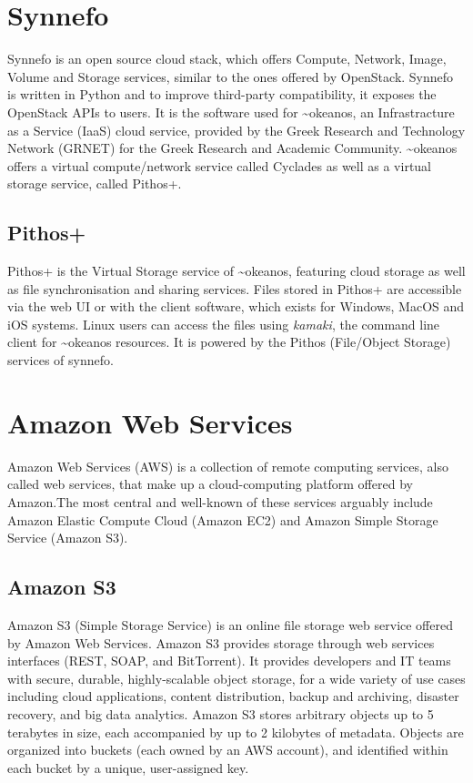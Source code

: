 \section{Synnefo}
  Synnefo\cite{synnefo} is an open source cloud stack, which offers Compute, Network, Image, Volume and Storage services, similar to the ones offered by OpenStack. Synnefo is written in Python and to improve third-party compatibility, it exposes the OpenStack APIs to users\cite{synnefo-api}. It is the software used for \textasciitilde okeanos\cite{okeanos}, an Infrastracture as a Service (IaaS) cloud service, provided by the Greek Research and Technology Network (GRNET) for the Greek Research and Academic Community. \textasciitilde okeanos offers a virtual compute/network service called Cyclades as well as a virtual storage service, called Pithos+.

  \subsection{Pithos+}
    Pithos+ is the Virtual Storage service of \textasciitilde okeanos, featuring cloud storage as well as file synchronisation and sharing services. Files stored in Pithos+ are accessible via the web UI or with the client software, which exists for Windows, MacOS and iOS systems. Linux users can access the files using \emph{kamaki}, the command line client for \textasciitilde okeanos resources. It is powered by the Pithos (File/Object Storage) services of synnefo.


\section{Amazon Web Services}
  Amazon Web Services (AWS) is a collection of remote computing services, also called web services, that make up a cloud-computing platform offered by Amazon.The most central and well-known of these services arguably include Amazon Elastic Compute Cloud (Amazon EC2) and Amazon Simple Storage Service (Amazon S3).

  \subsection{Amazon S3}
    Amazon S3\cite{amazon-s3} (Simple Storage Service) is an online file storage web service offered by Amazon Web Services. Amazon S3 provides storage through web services interfaces (REST, SOAP, and BitTorrent). It provides developers and IT teams with secure, durable, highly-scalable object storage, for a wide variety of use cases including cloud applications, content distribution, backup and archiving, disaster recovery, and big data analytics. Amazon S3 stores arbitrary objects up to 5 terabytes in size, each accompanied by up to 2 kilobytes of metadata. Objects are organized into buckets (each owned by an AWS account), and identified within each bucket by a unique, user-assigned key.

